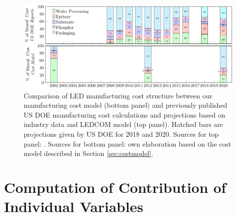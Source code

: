 \documentclass[10pt]{article}
\begin{document}
\begin{figure}[h]
	\centering
    \includegraphics[width=\textwidth]{2_SSL_EES/article/figures/costmodel_calibration.pdf}
	\caption{Comparison of LED manufacturing cost structure between our manufacturing cost model (bottom panel) and previously published US DOE manufacturing cost calculations and projections based on industry data and LEDCOM model (top panel). Hatched bars are projections given by US DOE for 2018 and 2020. Sources for top panel: \cite{doe2010solid}\cite{doe2011solid}\cite{doe2012solid}\cite{doe2013solid}\cite{doe2014solid}\cite{doe2015solid}\cite{doe2016solid}. Sources for bottom panel: own elaboration based on the cost model described in Section \cref{sec:costmodel}.}
	\label{fig:costmodel_calibration}
\end{figure}

\newpage
\section{Computation of Contribution of Individual Variables}
\label{sec:contribution_variables}
\end{document}
